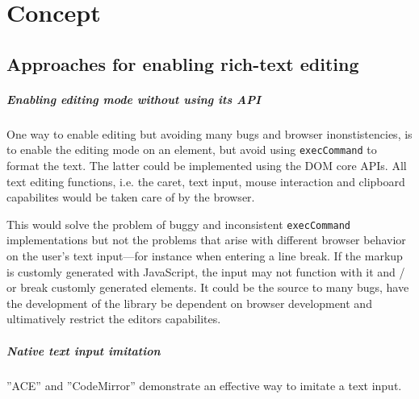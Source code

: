 \chapter{Concept}
\label{ch:concept}

\section{Approaches for enabling rich-text editing}


\paragraph{Enabling editing mode without using its API} One way to enable editing but avoiding many bugs and browser inonstistencies, is to enable the editing mode on an element, but avoid using \texttt{execCommand} to format the text. The latter could be implemented using the DOM core APIs. All text editing functions, i.e. the caret, text input, mouse interaction and clipboard capabilites would be taken care of by the browser.

This would solve the problem of buggy and inconsistent \texttt{execCommand} implementations but not the problems that arise with different browser behavior on the user's text input---for instance when entering a line break. If the markup is customly generated with JavaScript, the input may not function with it and / or break customly generated elements. It could be the source to many bugs, have the development of the library be dependent on browser development and ultimatively restrict the editors capabilites.

\paragraph{Native text input imitation} ''ACE'' and ''CodeMirror'' demonstrate an effective way to imitate a text input. 

